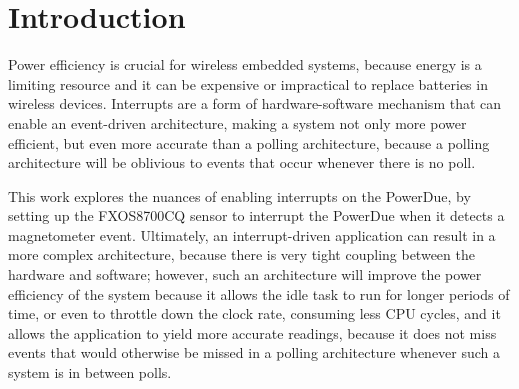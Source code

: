 \section{Introduction}
\label{sec:intro}
Power efficiency is crucial for wireless embedded systems, because energy is a
limiting resource and it can be expensive or impractical to replace batteries in
wireless devices. Interrupts are a form of hardware-software mechanism that can
enable an event-driven architecture, making a system not only more power
efficient, but even more accurate than a polling architecture, because a polling
architecture will be oblivious to events that occur whenever there is no poll.

This work explores the nuances of enabling interrupts on the PowerDue, by
setting up the FXOS8700CQ sensor to interrupt the PowerDue when it detects a
magnetometer event. Ultimately, an interrupt-driven application  can result in a
more complex architecture, because there is very tight coupling between the
hardware and software; however, such an architecture will improve the power
efficiency of the system because it allows the idle task to run for longer
periods of time, or even to throttle down the clock rate, consuming less CPU
cycles, and it allows the application to yield more accurate readings, because
it does not miss events that would otherwise be missed in a polling architecture
whenever such a system is in between polls.
